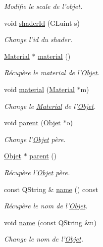 \begin{DoxyCompactItemize}
\begin{DoxyCompactList}\small\item\em Modifie le scale de l'objet. \end{DoxyCompactList}\item 
void \hyperlink{class_objet_a13f08bf7d1265bbf4ade92b755b27c1b}{shader\+Id} (G\+Luint s)
\begin{DoxyCompactList}\small\item\em Change l'id du shader. \end{DoxyCompactList}\item 
\hyperlink{class_material}{Material} $\ast$ \hyperlink{class_objet_a5b8f371853435fb08bba5163cb4dbe09}{material} ()
\begin{DoxyCompactList}\small\item\em Récupère le material de l'\hyperlink{class_objet}{Objet}. \end{DoxyCompactList}\item 
void \hyperlink{class_objet_a470e028ee53141cf9d11d107317989b7}{material} (\hyperlink{class_material}{Material} $\ast$m)
\begin{DoxyCompactList}\small\item\em Change le \hyperlink{class_material}{Material} de l'\hyperlink{class_objet}{Objet}. \end{DoxyCompactList}\item 
void \hyperlink{class_objet_a95e63a98dc9dc485fe874df30f2069ee}{parent} (\hyperlink{class_objet}{Objet} $\ast$o)
\begin{DoxyCompactList}\small\item\em Change l'\hyperlink{class_objet}{Objet} père. \end{DoxyCompactList}\item 
\hyperlink{class_objet}{Objet} $\ast$ \hyperlink{class_objet_aaa3c3290e5bb742363263600fcdb3e5e}{parent} ()
\begin{DoxyCompactList}\small\item\em Récupère l'\hyperlink{class_objet}{Objet} père. \end{DoxyCompactList}\item 
const Q\+String \& \hyperlink{class_objet_a4a702c189bedcbf1e65da6aec72c8e44}{name} () const 
\begin{DoxyCompactList}\small\item\em Récupère le nom de l'\hyperlink{class_objet}{Objet}. \end{DoxyCompactList}\item 
void \hyperlink{class_objet_a9fcc9af481f4e13f46ab7d1b40cf91fc}{name} (const Q\+String \&n)
\begin{DoxyCompactList}\small\item\em Change le nom de l'\hyperlink{class_objet}{Objet}. \end{DoxyCompactList}\end{DoxyCompactItemize}
